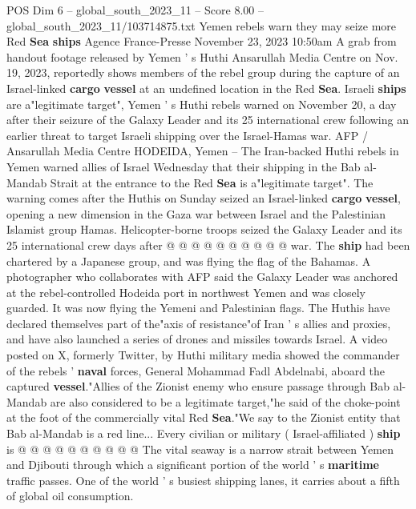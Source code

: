 \begin{textsample}{POS Dim 6 – global\_south\_2023\_11 – Score 8.00 – global\_south\_2023\_11/103714875.txt}  \label{ex:f6_pos_251}
Yemen rebels warn they may seize more Red \textbf{Sea} \textbf{ships} Agence France-Presse November 23, 2023 10:50am A grab from handout footage released by Yemen ' s Huthi Ansarullah Media Centre on Nov. 19, 2023, reportedly shows members of the rebel group during the capture of an Israel-linked \textbf{cargo} \textbf{vessel} at an undefined location in the Red \textbf{Sea}.
Israeli \textbf{ships} are a"legitimate target", Yemen ' s Huthi rebels warned on November 20, a day after their seizure of the Galaxy Leader and its 25 international crew following an earlier threat to target Israeli shipping over the Israel-Hamas war.
AFP / Ansarullah Media Centre HODEIDA, Yemen -- The Iran-backed Huthi rebels in Yemen warned allies of Israel Wednesday that their shipping in the Bab al-Mandab Strait at the entrance to the Red \textbf{Sea} is a"legitimate target".
The warning comes after the Huthis on Sunday seized an Israel-linked \textbf{cargo} \textbf{vessel}, opening a new dimension in the Gaza war between Israel and the Palestinian Islamist group Hamas.
Helicopter-borne troops seized the Galaxy Leader and its 25 international crew days after @ @ @ @ @ @ @ @ @ @ war.
The \textbf{ship} had been chartered by a Japanese group, and was flying the flag of the Bahamas.
A photographer who collaborates with AFP said the Galaxy Leader was anchored at the rebel-controlled Hodeida port in northwest Yemen and was closely guarded.
It was now flying the Yemeni and Palestinian flags.
The Huthis have declared themselves part of the"axis of resistance"of Iran ' s allies and proxies, and have also launched a series of drones and missiles towards Israel.
A video posted on X, formerly Twitter, by Huthi military media showed the commander of the rebels ' \textbf{naval} forces, General Mohammad Fadl Abdelnabi, aboard the captured \textbf{vessel}."Allies of the Zionist enemy who ensure passage through Bab al-Mandab are also considered to be a legitimate target,"he said of the choke-point at the foot of the commercially vital Red \textbf{Sea}."We say to the Zionist entity that Bab al-Mandab is a red line...
Every civilian or military ( Israel-affiliated ) \textbf{ship} is @ @ @ @ @ @ @ @ @ @ The vital seaway is a narrow strait between Yemen and Djibouti through which a significant portion of the world ' s \textbf{maritime} traffic passes.
One of the world ' s busiest shipping lanes, it carries about a fifth of global oil consumption.

\end{textsample}
